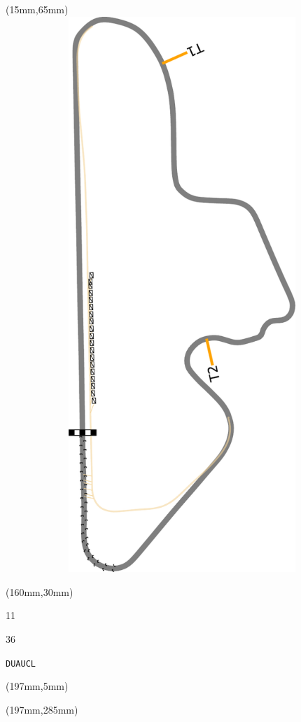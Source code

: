 \begin{textblock*}{185mm}(15mm,65mm)%
\centering
\mbox{\includegraphics[width=185mm,height=210mm,keepaspectratio]{PT/DUAUCL.pdf}}
\end{textblock*}
\begin{textblock*}{40mm}(160mm,30mm)%
\Large
\par{} 
\par11 
\par36 
\par\hfill\tiny\tt DUAUCL\\
\end{textblock*}
\begin{textblock*}{20mm}(197mm,5mm)%
\fbox{\thepage}
\label{DUAUCL}
\end{textblock*}
\begin{textblock*}{20mm}(197mm,285mm)%
\fbox{\thepage}
\end{textblock*}

